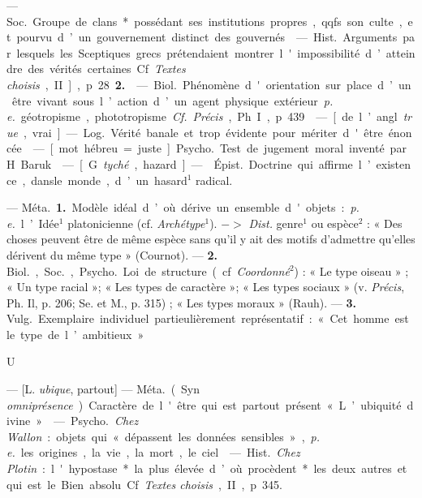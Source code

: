 \begin{itemize}[leftmargin=1cm, label=, itemsep=1pt]
 — \si{Soc.} Groupe de clans* possédant ses institutions propres,
qqfs. son culte, et pourvu d’un gouvernement distinct des gouvernés.

 — \si{Hist.} Arguments par lesquels les Sceptiques grecs
prétendaient montrer l'impossibilité d’atteindre des vérités certaines. Cf.
{\it Textes choisis}, II], p. 28 {\bf 2.}

 — \si{Biol.} Phénomène d'orientation sur place d’un être vivant
sous l’action d’un agent physique extérieur {\it p. e.} géotropisme,
phototropisme. {\it Cf.} {\it Précis}, Ph. I, p. 439.

 — [de l’angl. {\it true}, vrai] — \si{Log.} Vérité banale et
trop évidente pour mériter d'être énoncée.

 — [mot hébreu = juste] \si{Psycho.} Test de jugement moral
inventé par H. Baruk.

 — [G. {\it tyché}, hazard] —  \si{Épist.}
Doctrine qui affirme l’existence, dansle monde, d’un hasard$^1$ radical.

 — \si{Méta.} {\bf 1.} Modèle idéal d’où dérive un ensemble
d'objets : {\it p. e.} l’Idée$^1$ platonicienne (cf. {\it Archétype}$^1$).
$->$ {\it Dist.} genre$^1$ ou espèce$^2$ : « Des choses peuvent être de même
espèce sans qu'il y ait des motifs d'admettre qu'elles dérivent du même type
» (Cournot). — {\bf 2.} \si{Biol.}, \si{Soc.}, \si{Psycho.} Loi de structure
(cf. {\it Coordonné}$^2$) : « Le type oiseau » ; « Un type racial »; « Les
types de caractère »; « Les types sociaux » (v. {\it Précis}, Ph. Il, p. 206;
Se. et M., p. 315) ; « Les types moraux » (Rauh). —  {\bf 3.} \si{Vulg.}
Exemplaire individuel partieulièrement représentatif : « Cet homme est le
type de l’ambitieux. »

\begin{center}
U
\end{center}

 — [L. {\it ubique}, partout] — \si{Méta.} (Syn. {\it
omniprésence}). Caractère de l'être qui est partout présent « L’ubiquité
divine. »

 — \si{Psycho.} {\it Chez Wallon} : objets qui « dépassent
les données sensibles », {\it p. e.} les origines, la vie, la mort, le ciel.

 — \si{Hist.} {\it Chez Plotin} : l'hypostase* la plus élevée
d’où procèdent* les deux autres et qui est le Bien absolu. Cf. {\it Textes
choisis}, II, p. 345.


\end{itemize}
